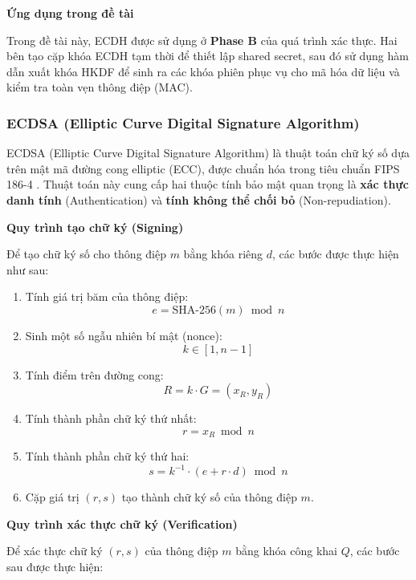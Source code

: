 \textbf{Ứng dụng trong đề tài}
\par\vspace{0.5em}
Trong đề tài này, ECDH được sử dụng ở \textbf{Phase B} của quá trình xác thực. Hai bên tạo cặp khóa ECDH tạm thời để thiết lập shared secret, sau đó sử dụng hàm dẫn xuất khóa HKDF để sinh ra các khóa phiên phục vụ cho mã hóa dữ liệu và kiểm tra toàn vẹn thông điệp (MAC).

\subsubsection{ECDSA (Elliptic Curve Digital Signature Algorithm)}

ECDSA (Elliptic Curve Digital Signature Algorithm) là thuật toán chữ ký số dựa trên mật mã đường cong elliptic (ECC), được chuẩn hóa trong tiêu chuẩn FIPS 186-4 \cite{fips186}. Thuật toán này cung cấp hai thuộc tính bảo mật quan trọng là \textbf{xác thực danh tính} (Authentication) và \textbf{tính không thể chối bỏ} (Non-repudiation).
\par\vspace{0.5em}
\textbf{Quy trình tạo chữ ký (Signing)}

Để tạo chữ ký số cho thông điệp $m$ bằng khóa riêng $d$, các bước được thực hiện như sau:

\begin{enumerate}
    \item Tính giá trị băm của thông điệp:
    \[
    e = \text{SHA-256}(m) \bmod n
    \]
    
    \item Sinh một số ngẫu nhiên bí mật (nonce):
    \[
    k \in [1, n-1]
    \]
    
    \item Tính điểm trên đường cong:
    \[
    R = k \cdot G = (x_R, y_R)
    \]
    
    \item Tính thành phần chữ ký thứ nhất:
    \[
    r = x_R \bmod n
    \]
    
    \item Tính thành phần chữ ký thứ hai:
    \[
    s = k^{-1} \cdot (e + r \cdot d) \bmod n
    \]
    
    \item Cặp giá trị $(r, s)$ tạo thành chữ ký số của thông điệp $m$.
\end{enumerate}

\textbf{Quy trình xác thực chữ ký (Verification)}

Để xác thực chữ ký $(r, s)$ của thông điệp $m$ bằng khóa công khai $Q$, các bước sau được thực hiện:

